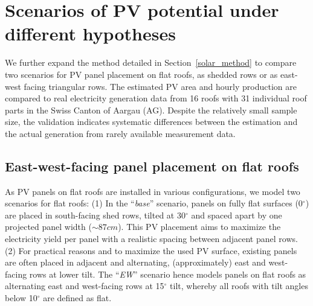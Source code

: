 \section{Scenarios of PV potential under different hypotheses}
\label{solar_scenarios}

We further expand the method detailed in Section~\ref{solar_method} to compare two scenarios for PV panel placement on flat roofs, as shedded rows or as east-west facing triangular rows. The estimated PV area and hourly production are compared to real electricity generation data from 16 roofs with 31 individual roof parts in the Swiss Canton of Aargau (AG). Despite the relatively small sample size, the validation indicates systematic differences between the estimation and the actual generation from rarely available measurement data. 

\subsection{East-west-facing panel placement on flat roofs}
\label{scenario_EW}

As PV panels on flat roofs are installed in various configurations, we model two scenarios for flat roofs: (1) In the “\textit{base}” scenario, panels on fully flat surfaces (0$^\circ$) are placed in south-facing shed rows, tilted at 30$^\circ$ and spaced apart by one projected panel width ($\sim 87 cm$). This PV placement aims to maximize the electricity yield per panel with a realistic spacing between adjacent panel rows. (2) For practical reasons and to maximize the used PV surface, existing panels are often placed in adjacent and alternating, (approximately) east and west-facing rows at lower tilt. The “\textit{EW}” scenario hence models panels on flat roofs as alternating east and west-facing rows at 15$^\circ$ tilt, whereby all roofs with tilt angles below 10$^\circ$ are defined as flat. 

